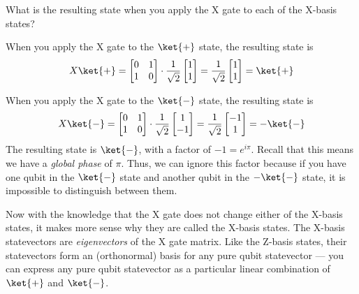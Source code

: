 \documentclass{article}
\theoremstyle{definition}
\newcommand{\kx}[1]{\ket{#1}}
\begin{document}
\begin{example}
	What is the resulting state when you apply the X gate to each of the X-basis states?

	\textnormal{When you apply the X gate to the $\kx+$ state, the resulting state is}
	\begin{equation}
		X \kx+ = \begin{bmatrix}
			0 & 1\\
			1 & 0
		\end{bmatrix} \cdot \frac{1}{\sqrt{2}}\begin{bmatrix}
			1\\
			1
		\end{bmatrix} = \frac{1}{\sqrt{2}}\begin{bmatrix}
			1\\
			1
		\end{bmatrix} = \kx+
	\end{equation}

	\textnormal{When you apply the X gate to the $\kx-$ state, the resulting state is}
	\begin{equation}
		X \kx- = \begin{bmatrix}
			0 & 1\\
			1 & 0
		\end{bmatrix} \cdot \frac{1}{\sqrt{2}}\begin{bmatrix}
			1\\
			-1
		\end{bmatrix} = \frac{1}{\sqrt{2}}\begin{bmatrix}
			-1\\
			1
		\end{bmatrix} = -\kx-
	\end{equation}
	\textnormal{The resulting state is $\kx-$, with a factor of $-1 = e^{i \pi}$.  Recall that this means we have a \textit{global phase} of $\pi$.  Thus, we can ignore this factor because if you have one qubit in the $\kx-$ state and another qubit in the $-\kx-$ state, it is impossible to distinguish between them.}

	\textnormal{Now with the knowledge that the X gate does not change either of the X-basis states, it makes more sense why they are called the X-basis states.  The X-basis statevectors are \textit{eigenvectors} of the X gate matrix.  Like the Z-basis states, their statevectors form an (orthonormal) basis for any pure qubit statevector --- you can express any pure qubit statevector as a particular linear combination of $\kx+$ and $\kx-$.}
\end{example}
\end{document}
